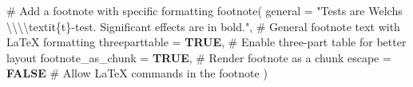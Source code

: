 \documentclass[
  bookmarksnumbered]{article}
\newenvironment{Shaded}{\begin{snugshade}}{\end{snugshade}}
\newcommand{\AttributeTok}[1]{\textcolor[rgb]{0.80,0.80,0.80}{#1}}
\newcommand{\CommentTok}[1]{\textcolor[rgb]{0.50,0.62,0.50}{#1}}
\newcommand{\ConstantTok}[1]{\textcolor[rgb]{0.86,0.64,0.64}{\textbf{#1}}}
\newcommand{\FunctionTok}[1]{\textcolor[rgb]{0.94,0.94,0.56}{#1}}
\newcommand{\NormalTok}[1]{\textcolor[rgb]{0.80,0.80,0.80}{#1}}
\newcommand{\SpecialCharTok}[1]{\textcolor[rgb]{0.86,0.64,0.64}{#1}}
\newcommand{\StringTok}[1]{\textcolor[rgb]{0.80,0.58,0.58}{#1}}
\begin{document}
\begin{Shaded}
\begin{Highlighting}[]
  \CommentTok{\# Add a footnote with specific formatting}
  \FunctionTok{footnote}\NormalTok{(}
    \AttributeTok{general =} \StringTok{"Tests are Welch\textquotesingle{}s }\SpecialCharTok{\textbackslash{}\textbackslash{}\textbackslash{}\textbackslash{}}\StringTok{textit\{t\}{-}test. Significant effects are in bold."}\NormalTok{,}
    \CommentTok{\# General footnote text with LaTeX formatting}
    \AttributeTok{threeparttable =} \ConstantTok{TRUE}\NormalTok{, }\CommentTok{\# Enable three{-}part table for better layout}
    \AttributeTok{footnote\_as\_chunk =} \ConstantTok{TRUE}\NormalTok{, }\CommentTok{\# Render footnote as a chunk}
    \AttributeTok{escape =} \ConstantTok{FALSE} \CommentTok{\# Allow LaTeX commands in the footnote}
\NormalTok{  )}
\end{Highlighting}
\end{Shaded}
\end{document}
